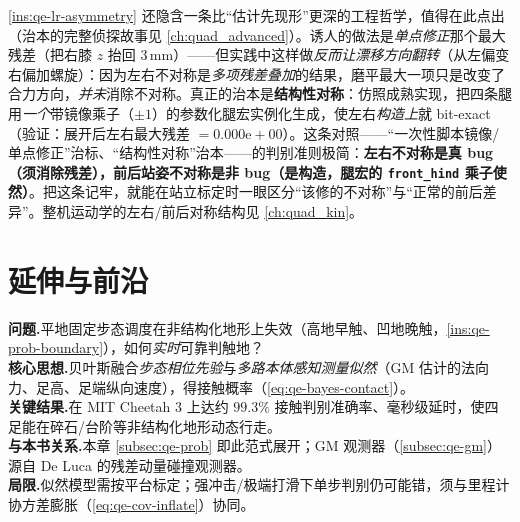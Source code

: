 \begin{insight}\label{ins:qe-lr-structural}
\cref{ins:qe-lr-asymmetry} 还隐含一条比“估计先现形”更深的工程哲学，值得在此点出（治本的完整侦探故事见 \cref{ch:quad_advanced}）。诱人的做法是\emph{单点修正}那个最大残差（把右膝 $z$ 抬回 $3\,\mathrm{mm}$）——但实践中这样做\emph{反而让漂移方向翻转}（从左偏变右偏加螺旋）：因为左右不对称是\emph{多项残差叠加}的结果，磨平最大一项只是改变了合力方向，\emph{并未}消除不对称。真正的治本是\textbf{结构性对称}：仿照成熟实现，把四条腿用\emph{一个}带镜像乘子（$\pm1$）的参数化腿宏实例化生成，使左右\emph{构造上}就 bit-exact（验证：展开后左右最大残差 $=0.000\mathrm{e}{+}00$）。这条对照——“一次性脚本镜像/单点修正”治标、“结构性对称”治本——的判别准则极简：\textbf{左右不对称是真 bug（须消除残差），前后站姿不对称是非 bug（是构造，腿宏的 \texttt{front\_hind} 乘子使然）}。把这条记牢，就能在站立标定时一眼区分“该修的不对称”与“正常的前后差异”。整机运动学的左右/前后对称结构见 \cref{ch:quad_kin}。
\end{insight}

\section{延伸与前沿}
\label{sec:qe-frontier}

\begin{paper}\label{paper:qe-bledt}
\textbf{问题.}\;平地固定步态调度在非结构化地形上失效（高地早触、凹地晚触，\cref{ins:qe-prob-boundary}），如何\emph{实时}可靠判触地？\\
\textbf{核心思想.}\;贝叶斯融合\emph{步态相位先验}与\emph{多路本体感知测量似然}（GM 估计的法向力、足高、足端纵向速度），得接触概率（\cref{eq:qe-bayes-contact}）。\\
\textbf{关键结果.}\;在 MIT Cheetah 3\cite{bledt2018cheetah3} 上达约 $99.3\%$ 接触判别准确率、毫秒级延时，使四足能在碎石/台阶等非结构化地形动态行走。\\
\textbf{与本书关系.}\;本章 \cref{subsec:qe-prob} 即此范式展开；GM 观测器（\cref{subsec:qe-gm}）源自 De Luca\cite{deluca2006collision} 的残差动量碰撞观测器。\\
\textbf{局限.}\;似然模型需按平台标定；强冲击/极端打滑下单步判别仍可能错，须与里程计协方差膨胀（\cref{eq:qe-cov-inflate}）协同。
\end{paper}

